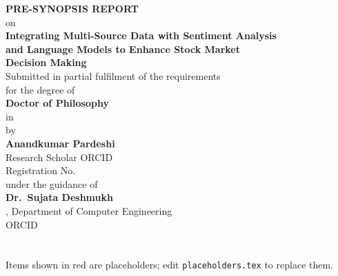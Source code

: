 \documentclass[12pt,a4paper,oneside]{report}
\begin{document}
\pagestyle{plain}

\begin{titlepage}
\centering
\vspace*{0.4cm}
{\large\bfseries PRE-SYNOPSIS REPORT}\\[0.3cm]
{\normalsize on}\\[0.45cm]
{\large\bfseries Integrating Multi-Source Data with Sentiment Analysis\\[2pt]
and Language Models to Enhance Stock Market\\[2pt] Decision Making}\\[1.0cm]
{\normalsize Submitted in partial fulfilment of the requirements\\ for the degree of}\\[0.3cm]
{\large\bfseries Doctor of Philosophy}\\[0.15cm]
{\normalsize in \Discipline}\\[1.0cm]
{\normalsize by}\\[0.25cm]
{\large\bfseries Anandkumar Pardeshi}\\[0.12cm]
{\normalsize Research Scholar \quad ORCID \ScholarORCID}\\[0.12cm]
{\normalsize Registration No.\ \RegNo}\\[1.0cm]
{\normalsize under the guidance of}\\[0.25cm]
{\large\bfseries Dr.\ Sujata Deshmukh}\\[0.12cm]
{\normalsize \GuideDesignation, Department of Computer Engineering}\\[0.12cm]
{\normalsize ORCID \GuideORCID}\\[1.2cm]
{\normalsize \ResearchCentre}\\[0.2cm]
{\normalsize \Univ}\\[1.2cm]
{\normalsize \SubMonth}
\vfill
{\footnotesize\color{phcolor} Items shown in red are placeholders; edit
\texttt{placeholders.tex} to replace them.}
\end{titlepage}



\clearpage
{}
\setcounter{page}{1}





\end{document}
